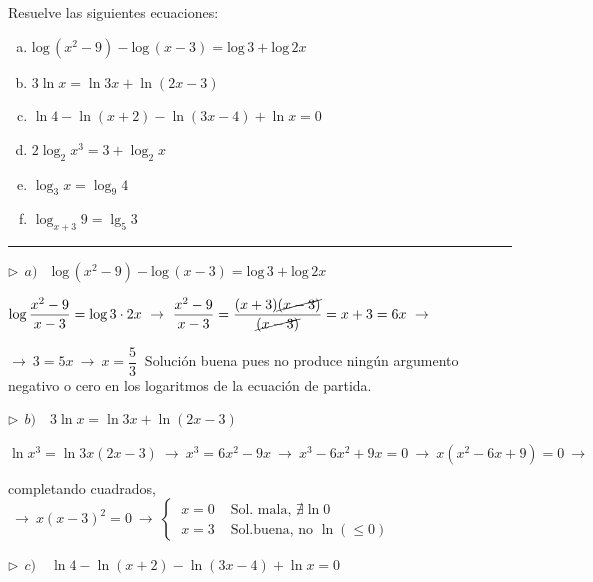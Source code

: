 \begin{miejercicio}

Resuelve las siguientes ecuaciones:

\begin{small}
\begin{multicols}{2}
\begin{enumerate}[a) ]
\item $\mathrm{log}\, (x^2-9)-\mathrm{log}\, (x-3)=\mathrm{log}\, 3+\mathrm{log}\, 2x$
\item $3\ln x=\ln 3x+\ln(2x-3)$ 	
\item $\ln 4-\ln(x+2)-\ln(3x-4)+\ln x=0$
\item $2\log_2 x^3=3+\log_2 x$
\item $\log_3 x=\log_9 4$
\item $\log_{x+3}9=\lg_5 3$
\end{enumerate}	
\end{multicols}
\end{small}

\rule{250pt}{0.1pt}

\vspace{5mm} $\triangleright \ \ a) \quad  \mathrm{log}\, (x^2-9)-\mathrm{log}\, (x-3)=\mathrm{log}\, 3+\mathrm{log}\, 2x$

\vspace{2mm} $\log \dfrac{x^2-9}{x-3}=\log 3\cdot 2x \ \to \  \dfrac{x^2-9}{x-3}= \dfrac{(x+3)\cancel{(x-3)}}{\cancel{(x-3)}}=x+3=6x \ \to $

\vspace{2mm} $\to \ 3=5x \ \to \ x=\dfrac 5 3 \ $ Solución buena pues no produce ningún argumento negativo o cero en los logaritmos de la ecuación de partida.


\vspace{5mm} $\triangleright \ \ b) \quad  3\ln x=\ln 3x+\ln(2x-3)$

\vspace{2mm} $\ln x^3=\ln 3x(2x-3) \ \to \ x^3=6x^2-9x \ \to \ x^3-6x^2+9x=0 \ \to \ x(x^2-6x+9)=0 \ \to$

\vspace{2mm} completando cuadrados, $\ \to \  x(x-3)^2=0 \ \to \ \begin{cases}
\ x=0 & \text{ Sol. mala, } \nexists \ln 0 \\
\ x= 3 & \text{ Sol.buena, no } \ln (\le 0)  	
 \end{cases}$

\vspace{5mm} $\triangleright \ \ c) \quad  \ln 4-\ln(x+2)-\ln(3x-4)+\ln x=0$


\end{miejercicio}
